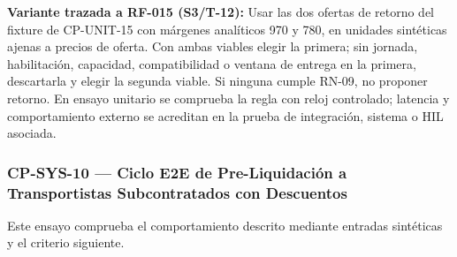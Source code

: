 \par\noindent\textbf{Variante trazada a RF-015 (S3/T-12):} Usar las dos ofertas de retorno del fixture de CP-UNIT-15 con márgenes analíticos 970 y 780, en unidades sintéticas ajenas a precios de oferta. Con ambas viables elegir la primera; sin jornada, habilitación, capacidad, compatibilidad o ventana de entrega en la primera, descartarla y elegir la segunda viable. Si ninguna cumple RN-09, no proponer retorno. En ensayo unitario se comprueba la regla con reloj controlado; latencia y comportamiento externo se acreditan en la prueba de integración, sistema o HIL asociada.\par
\subsubsection*{CP-SYS-10 — Ciclo E2E de Pre-Liquidación a Transportistas Subcontratados con Descuentos}\label{sec:9-cp-sys-10}
Este ensayo comprueba el comportamiento descrito mediante entradas sintéticas y el criterio siguiente.

